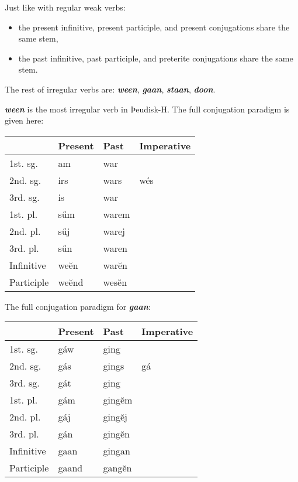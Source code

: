 Just like with regular weak verbs:

\begin{itemize}
\item the present infinitive, present participle, and present conjugations share the same stem,
\item the past infinitive, past participle, and preterite conjugations share the same stem.
\end{itemize}

The rest of irregular verbs are: \textbf{\emph{ween}}, \textbf{\emph{gaan}}, \textbf{\emph{staan}}, \textbf{\emph{doon}}.

\textbf{\emph{ween}} is the most irregular verb in Þeudisk-H. The full conjugation paradigm is given here:

\begin{center}
\begin{tabular}{llll}
& Present & Past & Imperative \\
\hline
1st. sg. & am  & war   &     \\
2nd. sg. & irs & wars  & wés \\
3rd. sg. & is  & war   &     \\
1st. pl. & sűm & warem &     \\
2nd. pl. & sűj & warej &     \\
3rd. pl. & sűn & waren &     \\
\hline
Infinitive & weĕn  & warĕn  \\
Participle & weĕnd & wesĕn \\
\end{tabular}
\end{center}

The full conjugation paradigm for \textbf{\emph{gaan}}:

\begin{center}
\begin{tabular}{llll}
& Present & Past & Imperative \\
\hline
1st. sg. & gáw & ging  & \\
2nd. sg. & gás & gings & gá \\
3rd. sg. & gát & ging  & \\
1st. pl. & gám & gingĕm & \\
2nd. pl. & gáj & gingĕj & \\
3rd. pl. & gán & gingĕn & \\
\hline
Infinitive & gaan & gingan \\
Participle & gaand & gangĕn \\
\end{tabular}
\end{center}

